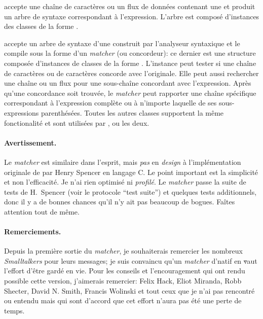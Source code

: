 \documentclass[a4paper,10pt,twoside]{book}
\begin{document}
 accepte une chaîne de caractères ou un flux de
données contenant une \expreg et produit un arbre de syntaxe
correspondant à l'expression. L'arbre est composé d'instances des
classes de la forme .

 accepte un arbre de syntaxe d'une \expreg construit
par l'analyseur syntaxique et le compile sous la forme d'un
\emph{matcher} (ou concordeur): ce dernier est une structure composée
d'instances de classes de la forme . 
L'instance  peut tester si une chaîne de caractères
ou  %
de caractères concorde avec l'\expreg originale. Elle peut aussi
rechercher une chaîne ou un flux pour une sous-chaîne concordant avec
l'expression. Après qu'une concordance soit trouvée, le \emph{matcher}
peut rapporter une chaîne spécifique correspondant à l'expression
complète ou à n'importe laquelle de ses sous-expressions parenthésées.
Toutes les autres classes supportent la même fonctionalité et sont
utilisées par ,  ou les deux.

\paragraph{Avertissement.} Le \emph{matcher} est similaire dans
l'esprit, mais \emph{pas} en \emph{design}
à l'implémentation originale de \expreg par Henry Spencer en langage
C. Le point important est la simplicité et non l'efficacité. Je n'ai
rien optimisé ni \emph{profilé}.
Le \emph{matcher} passe la suite de tests de H.~Spencer (voir le
protocole ``test suite'') et quelques tests additionnels, donc il y a
de bonnes chances qu'il n'y ait pas beaucoup de bogues. Faîtes
attention tout de même. 

\paragraph{Remerciements.}
Depuis la première sortie du \emph{matcher}, je souhaiterais remercier
les nombreux \emph{Smalltalkers} pour leurs messages; je suis
convaincu qu'un \emph{matcher} d'\expreg natif en \st vaut l'effort 
d'être gardé en vie. Pour les conseils et l'encouragement qui ont rendu
possible cette version, j'aimerais remercier:
Felix Hack, Eliot Miranda, Robb Shecter, David N. Smith, Francis
Wolinski et tout ceux que je n'ai pas rencontré ou entendu mais qui sont
d'accord que cet effort n'aura pas été une perte de temps.
\end{document}
